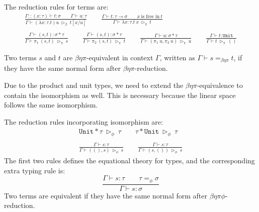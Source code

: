 \begin{definition}
    The reduction rules for terms are:
    \begin{gather*}
        \frac{\Gamma::(x:\tau)\vdash t:\sigma\qquad \Gamma\vdash u:\tau}{\Gamma \vdash (\lambda x : \tau.t)u \ \triangleright_\beta\ t[x/u]}
        \qquad 
        \frac{\Gamma \vdash t : \tau \to \sigma\qquad x\ \textrm{is free in}\ t}{\Gamma \vdash \lambda x : \tau. t\ x\ \triangleright_\eta\ t}\\
        \ \\
        \frac{\Gamma \vdash (s, t) : \sigma * \tau}{\Gamma \vdash \pi_1\ (s, t)\ \triangleright_\pi\ s}
        \qquad
        \frac{\Gamma \vdash (s, t) : \sigma * \tau}{\Gamma \vdash \pi_2\ (s, t)\ \triangleright_\pi\ t}
        \qquad
        \frac{\Gamma \vdash u : \sigma * \tau}{\Gamma \vdash (\pi_1\ u, \pi_2\ u)\ \triangleright_\pi\ u}
        \qquad
        \frac{\Gamma \vdash t : \texttt{Unit}}{\Gamma \vdash t\ \triangleright_\pi\ ()}
    \end{gather*}

    Two terms $s$ and $t$ are $\beta\eta\pi$-equivalent in context $\Gamma$, written as $\Gamma \vdash s =_{\beta\eta\pi} t$, if they have the same normal form after $\beta\eta\pi$-reduction.
\end{definition}

Due to the product and unit types, we need to extend the $\beta\eta\pi$-equivalence to contain the isomorphism as well. This is necessary because the linear space follows the same isomorphism.
\begin{definition}
    The reduction rules incorporating isomorphism are:
    \begin{gather*}
        \texttt{Unit} * \tau\ \triangleright_\phi\ \tau
        \qquad 
        \tau * \texttt{Unit}\ \triangleright_\phi\ \tau\\
        \ \\        
        \frac{\Gamma \vdash s : \tau}{\Gamma \vdash ((), s)\ \triangleright_\phi\ s}
        \qquad
        \frac{\Gamma \vdash s : \tau}{\Gamma \vdash (s, ())\ \triangleright_\phi\ s}
    \end{gather*}
    The first two rules defines the equational theory for types, and the corresponding extra typing rule is:
    $$
    \frac{\Gamma \vdash s : \tau\qquad \tau =_\phi \sigma}{\Gamma \vdash s : \sigma}
    $$
    Two terms are equivalent if they have the same normal form after $\beta\eta\pi\phi$-reduction.
\end{definition}

